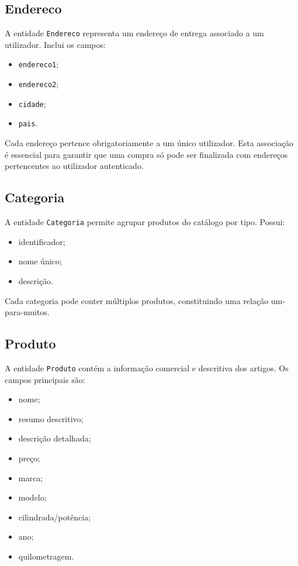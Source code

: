 \documentclass[10pt,a4paper]{report}
\begin{document}
\subsection{Endereco}

A entidade \texttt{Endereco} representa um endereço de entrega associado a um utilizador. Inclui os campos:

\begin{itemize}
    \item \texttt{endereco1};
    \item \texttt{endereco2};
    \item \texttt{cidade};
    \item \texttt{pais}.
\end{itemize}

Cada endereço pertence obrigatoriamente a um único utilizador. Esta associação é essencial para garantir que uma compra só pode ser finalizada com endereços pertencentes ao utilizador autenticado.

\subsection{Categoria}

A entidade \texttt{Categoria} permite agrupar produtos do catálogo por tipo. Possui:

\begin{itemize}
    \item identificador;
    \item nome único;
    \item descrição.
\end{itemize}

Cada categoria pode conter múltiplos produtos, constituindo uma relação um-para-muitos.

\subsection{Produto}

A entidade \texttt{Produto} contém a informação comercial e descritiva dos artigos. Os campos principais são:

\begin{itemize}
    \item nome;
    \item resumo descritivo;
    \item descrição detalhada;
    \item preço;
    \item marca;
    \item modelo;
    \item cilindrada/potência;
    \item ano;
    \item quilometragem.
\end{itemize}
\end{document}
